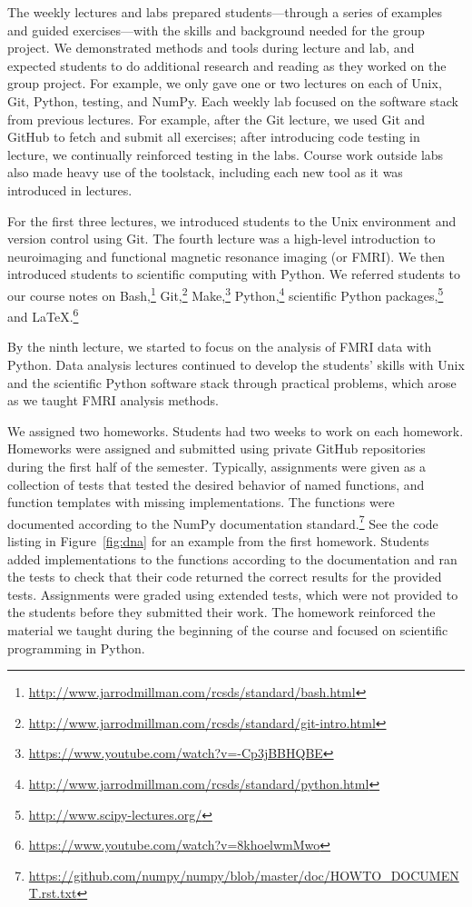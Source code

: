 The weekly lectures and labs prepared students---through a
series of examples and guided exercises---with the skills and
background needed for the group project.
We demonstrated methods and tools during lecture and lab,
and expected students to do additional research and reading as they worked on
the group project.
For example, we only gave one or two lectures on each of Unix, Git, Python,
testing, and NumPy.
Each weekly lab focused on the software stack from previous lectures.
For example, after the Git lecture, we used Git and GitHub to fetch and submit
all exercises;
after introducing code testing in lecture, we continually reinforced testing in
the labs.
Course work outside labs also made heavy use of the toolstack, including each
new tool as it was introduced in lectures.

For the first three lectures, we introduced students to the Unix environment
and version control using Git.
The fourth lecture was a high-level introduction to neuroimaging and
functional magnetic resonance imaging (or FMRI).
We then introduced students to scientific computing with Python.
We referred students to our course notes on
Bash,\footnote{\url{http://www.jarrodmillman.com/rcsds/standard/bash.html}}
Git,\footnote{\url{http://www.jarrodmillman.com/rcsds/standard/git-intro.html}}
Make,\footnote{\url{https://www.youtube.com/watch?v=-Cp3jBBHQBE}}
Python,\footnote{\url{http://www.jarrodmillman.com/rcsds/standard/python.html}}
scientific Python packages,\footnote{\url{http://www.scipy-lectures.org/}}
and \LaTeX.\footnote{\url{https://www.youtube.com/watch?v=8khoelwmMwo}}

By the ninth lecture, we started to focus on the analysis of FMRI data with
Python.
Data analysis lectures continued to develop the students' skills with
Unix and the scientific Python software stack through practical problems,
which arose as we taught FMRI analysis methods.

We assigned two homeworks.
Students had two weeks to work on each homework.
Homeworks were assigned and submitted using private GitHub repositories  during
the first half of the semester.
Typically, assignments were given as a collection of tests that tested the
desired behavior of named functions, and function templates with missing
implementations.
The functions were documented according to the NumPy documentation
standard.\footnote{\url{https://github.com/numpy/numpy/blob/master/doc/HOWTO_DOCUMENT.rst.txt}}
See the code listing in Figure~\ref{fig:dna} for an example from the first homework.
Students added implementations to the functions according to the documentation
and ran the tests to check that their code returned the correct results
for the provided tests.
Assignments were graded using extended tests, which were not provided to
the students before they submitted their work.
The homework reinforced the material we taught during the
beginning of the course and focused on scientific programming
in Python.

